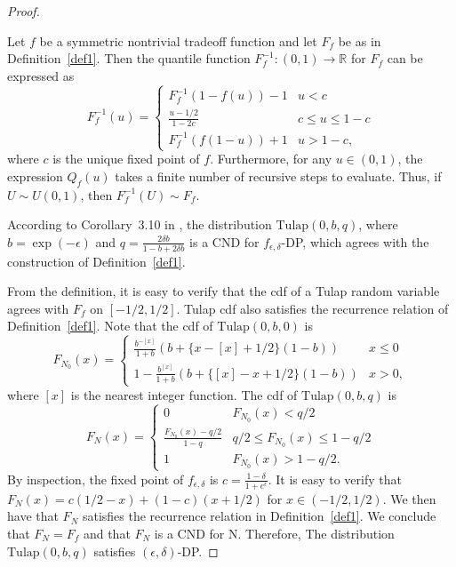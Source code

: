 \documentclass{article}
\begin{document}
\begin{proof}
\begin{proposition}
    \label{prop1}
    Let $f$ be a symmetric nontrivial tradeoff function and let $F_f$ be as in Definition~\ref{def1}. 
    Then the quantile function $F_f^{-1}:(0,1)\rightarrow \mathbb{R}$ for $F_f$ can be expressed as
    \[F_f^{-1}(u) = \begin{cases}
    F_f^{-1}(1-f(u))-1&u<c\\
    \frac{u-1/2}{1-2c}&c\leq u\leq 1-c\\
    F_f^{-1}(f(1-u))+1&u>1-c,
    \end{cases}\]
    where $c$ is the unique fixed point of $f$. 
    {Furthermore, for any $u\in (0,1)$, the expression $Q_f(u)$ takes a finite number of recursive steps to evaluate. Thus,} 
    if $U\sim U(0,1)$, then $F_f^{-1}(U) \sim F_f$. 
\end{proposition}

According to Corollary~3.10 in \cite{awan2023canonical}, 
the distribution $\mathrm{Tulap}(0,b,q)$, where $b=\exp(-\epsilon)$ and $q = \frac{2\delta b}{1-b+2\delta b}$ 
is a CND for $f_{\epsilon,\delta}$-DP, which agrees with the construction of Definition~\ref{def1}. 

From the definition, it is easy to verify that the cdf of a Tulap random variable agrees with $F_f$ on $[-1/2,1/2]$. 
Tulap cdf also satisfies the recurrence relation of Definition~\ref{def1}. 
Note that the cdf of $\mathrm{Tulap}(0,b,0)$ is 
\[F_{N_0}(x) = \begin{cases}
    \frac{b^{-[x]}}{1+b}(b+\{x-[x]+1/2\}(1-b))& x\leq 0\\
    1- \frac{b^{[x]}}{1+b}(b+\{[x]-x+1/2\}(1-b))&x>0,
\end{cases}\]
where $[x]$ is the nearest integer function. 
The cdf of $\mathrm{Tulap}(0,b,q)$ is
\[F_N(x) = \begin{cases}
    0&F_{N_0}(x)<q/2\\
    \frac{F_{N_0}(x)-q/2}{1-q}& q/2\leq F_{N_0}(x)\leq 1-q/2\\
    1&F_{N_0}(x)>1-q/2.
\end{cases}\]
By inspection, the fixed point of $f_{\epsilon,\delta}$ is $c=\frac{1-\delta}{1+e^\epsilon}$. 
It is easy to verify that $F_N(x) = c(1/2-x) + (1-c)(x+1/2)$ for $x\in (-1/2,1/2)$. 
We then have that $F_N$ satisfies the recurrence relation in Definition~\ref{def1}. 
We conclude that $F_N = F_f$ and that $F_N$ is a CND for N. Therefore, The distribution $\mathrm{Tulap}(0,b,q)$ satisfies $(\epsilon, \delta)$-DP.

\end{proof}
\printbibliography
\end{document}
